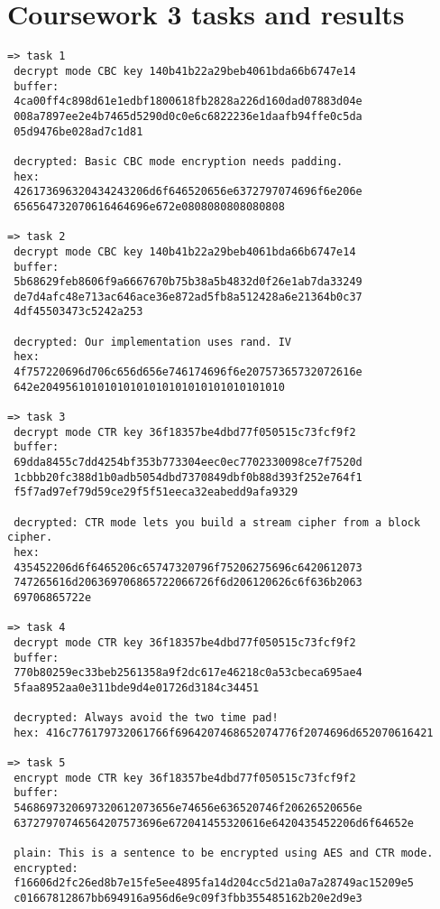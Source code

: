 \documentclass{article}
\begin{document}
\newpage
\appendix

\section{\\Coursework 3 tasks and results} \label{App:AppendixA}
\small
\begin{verbatim}
=> task 1
 decrypt mode CBC key 140b41b22a29beb4061bda66b6747e14
 buffer:
 4ca00ff4c898d61e1edbf1800618fb2828a226d160dad07883d04e
 008a7897ee2e4b7465d5290d0c0e6c6822236e1daafb94ffe0c5da
 05d9476be028ad7c1d81

 decrypted: Basic CBC mode encryption needs padding.
 hex:
 426173696320434243206d6f646520656e6372797074696f6e206e
 656564732070616464696e672e0808080808080808

=> task 2
 decrypt mode CBC key 140b41b22a29beb4061bda66b6747e14
 buffer:
 5b68629feb8606f9a6667670b75b38a5b4832d0f26e1ab7da33249
 de7d4afc48e713ac646ace36e872ad5fb8a512428a6e21364b0c37
 4df45503473c5242a253

 decrypted: Our implementation uses rand. IV
 hex:
 4f757220696d706c656d656e746174696f6e20757365732072616e
 642e20495610101010101010101010101010101010

=> task 3
 decrypt mode CTR key 36f18357be4dbd77f050515c73fcf9f2
 buffer:
 69dda8455c7dd4254bf353b773304eec0ec7702330098ce7f7520d
 1cbbb20fc388d1b0adb5054dbd7370849dbf0b88d393f252e764f1
 f5f7ad97ef79d59ce29f5f51eeca32eabedd9afa9329
 
 decrypted: CTR mode lets you build a stream cipher from a block cipher.
 hex:
 435452206d6f6465206c65747320796f75206275696c6420612073
 747265616d206369706865722066726f6d206120626c6f636b2063
 69706865722e

=> task 4
 decrypt mode CTR key 36f18357be4dbd77f050515c73fcf9f2
 buffer:
 770b80259ec33beb2561358a9f2dc617e46218c0a53cbeca695ae4
 5faa8952aa0e311bde9d4e01726d3184c34451

 decrypted: Always avoid the two time pad!
 hex: 416c776179732061766f6964207468652074776f2074696d652070616421

=> task 5
 encrypt mode CTR key 36f18357be4dbd77f050515c73fcf9f2
 buffer:
 5468697320697320612073656e74656e636520746f20626520656e
 63727970746564207573696e672041455320616e6420435452206d6f64652e
 
 plain: This is a sentence to be encrypted using AES and CTR mode.
 encrypted:
 f16606d2fc26ed8b7e15fe5ee4895fa14d204cc5d21a0a7a28749ac15209e5
 c01667812867bb694916a956d6e9c09f3fbb355485162b20e2d9e3


\end{verbatim}
\end{document}
